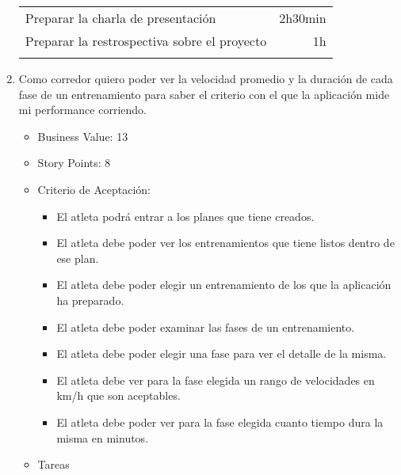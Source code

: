 \begin{enumerate}
\begin{longtable}[c]{@{}lr@{}}
\begin{minipage}[t]{0.89\columnwidth}
  Preparar la charla de presentación
  \end{minipage} & \begin{minipage}[t]{0.11\columnwidth}\raggedleft
  2h30min
  \end{minipage}
  \\\noalign{\medskip}
  \begin{minipage}[t]{0.89\columnwidth}\raggedright
  Preparar la restrospectiva sobre el proyecto
  \end{minipage} & \begin{minipage}[t]{0.11\columnwidth}\raggedleft
  1h
  \end{minipage}
  \\\noalign{\medskip}
  \hline
  \end{longtable}
\item
  Como corredor quiero poder ver la velocidad promedio y la duración de
  cada fase de un entrenamiento para saber el criterio con el que la
  aplicación mide mi performance corriendo.

  \begin{itemize}
  \itemsep1pt\parskip0pt
  \item
    Business Value: 13
  \item
    Story Points: 8
  \item
    Criterio de Aceptación:

    \begin{itemize}
    \itemsep1pt\parskip0pt
    \item
      El atleta podrá entrar a los planes que tiene creados.
    \item
      El atleta debe poder ver los entrenamientos que tiene listos
      dentro de ese plan.
    \item
      El atleta debe poder elegir un entrenamiento de los que la
      aplicación ha preparado.
    \item
      El atleta debe poder examinar las fases de un entrenamiento.
    \item
      El atleta debe poder elegir una fase para ver el detalle de la
      misma.
    \item
      El atleta debe ver para la fase elegida un rango de velocidades en
      km/h que son aceptables.
    \item
      El atleta debe poder ver para la fase elegida cuanto tiempo dura
      la misma en minutos.
    \end{itemize}
  \item
    Tareas
  \end{itemize}


\end{enumerate}
